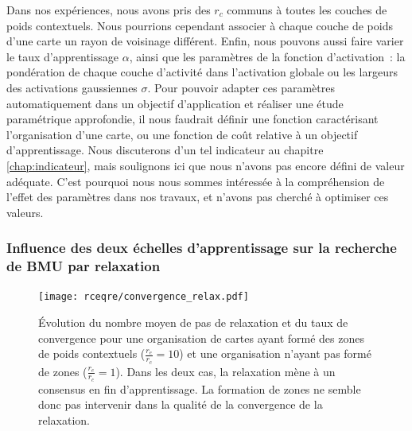 \documentclass[../main]{subfiles}
\begin{document}
Dans nos expériences, nous avons pris des $r_c$ communs à toutes les couches de poids contextuels.
Nous pourrions cependant associer à chaque couche de poids d'une carte un rayon de voisinage différent. 
Enfin, nous pouvons aussi faire varier le taux d'apprentissage $\alpha$, ainsi que les paramètres de la fonction d'activation~: la pondération de chaque couche d'activité dans l'activation globale ou les largeurs des activations gaussiennes $\sigma$.
Pour pouvoir adapter ces paramètres automatiquement dans un objectif d'application et réaliser une étude paramétrique approfondie, il nous faudrait définir une fonction caractérisant l'organisation d'une carte, ou une fonction de coût relative à un objectif d'apprentissage. 
Nous discuterons d'un tel indicateur au chapitre \ref{chap:indicateur}, mais soulignons ici que nous n'avons pas encore défini de valeur adéquate. C'est pourquoi nous nous sommes intéressée à la compréhension de l'effet des paramètres dans nos travaux, et n'avons pas cherché à optimiser ces valeurs.

\subsubsection{Influence des deux échelles d'apprentissage sur la recherche de BMU par relaxation}
\begin{figure}
	\centering\texttt{[image: rceqre/convergence\_relax.pdf]}
	\caption{\'Evolution du nombre moyen de pas de relaxation et du taux de convergence pour une organisation de cartes ayant formé des zones de poids contextuels ($\frac{r_e}{r_c} = 10$) et une organisation n'ayant pas formé de zones ($\frac{r_e}{r_c} = 1$). Dans les deux cas, la relaxation mène à un consensus en fin d'apprentissage. La formation de zones ne semble donc pas intervenir dans la qualité de la convergence de la relaxation. \label{fig:conv_rcre}}
\end{figure}
\end{document}
